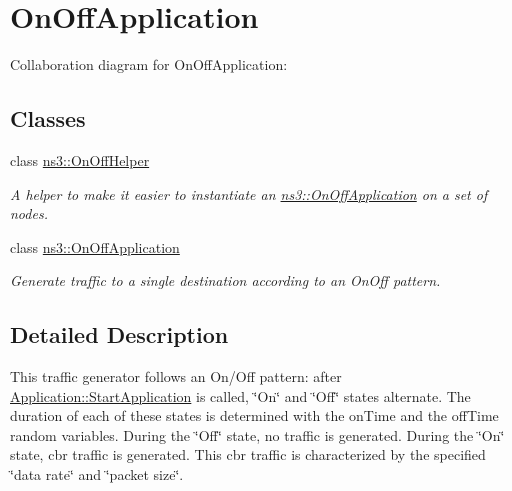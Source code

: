 \hypertarget{group__onoff}{}\section{On\+Off\+Application}
\label{group__onoff}
Collaboration diagram for On\+Off\+Application\+:
\subsection*{Classes}
\begin{DoxyCompactItemize}
\item 
class \hyperlink{classns3_1_1OnOffHelper}{ns3\+::\+On\+Off\+Helper}
\begin{DoxyCompactList}\small\item\em A helper to make it easier to instantiate an \hyperlink{classns3_1_1OnOffApplication}{ns3\+::\+On\+Off\+Application} on a set of nodes. \end{DoxyCompactList}\item 
class \hyperlink{classns3_1_1OnOffApplication}{ns3\+::\+On\+Off\+Application}
\begin{DoxyCompactList}\small\item\em Generate traffic to a single destination according to an On\+Off pattern. \end{DoxyCompactList}\end{DoxyCompactItemize}


\subsection{Detailed Description}
This traffic generator follows an On/\+Off pattern\+: after \hyperlink{classns3_1_1Application_a3405dd01508beacce8ed6e3a20bdf05a}{Application\+::\+Start\+Application} is called, \char`\"{}\+On\char`\"{} and \char`\"{}\+Off\char`\"{} states alternate. The duration of each of these states is determined with the on\+Time and the off\+Time random variables. During the \char`\"{}\+Off\char`\"{} state, no traffic is generated. During the \char`\"{}\+On\char`\"{} state, cbr traffic is generated. This cbr traffic is characterized by the specified \char`\"{}data rate\char`\"{} and \char`\"{}packet size\char`\"{}. 